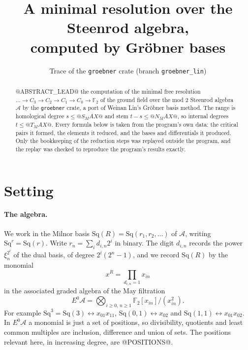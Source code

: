 \documentclass[11pt]{article}
\title{A minimal resolution over the Steenrod algebra,\\ computed by Gröbner bases}
\author{Trace of the \texttt{groebner} crate (branch \texttt{groebner\_lin})}
\date{}
\newcommand{\Sq}{\mathrm{Sq}}
\newcommand{\F}{\mathbb{F}_2}
\newcommand{\A}{\mathcal{A}}
\begin{document}
\maketitle

\begin{abstract}
@ABSTRACT_LEAD@ the computation of the minimal free resolution
$\dots \to C_3 \to C_2 \to C_1 \to C_0 \to \F$ of the ground field over the mod $2$ Steenrod
algebra $\A$ by the \texttt{groebner} crate, a port of Weinan Lin's Gröbner basis method. The
range is homological degree $s \le @S_MAX@$ and stem $t - s \le @N_MAX@$, so internal degrees $t \le @T_MAX@$.
Every formula below is taken from the program's own data: the critical pairs it formed, the
elements it reduced, and the bases and differentials it produced. Only the bookkeeping of the
reduction steps was replayed outside the program, and the replay was checked to reproduce the
program's results exactly.
\end{abstract}

\section{Setting}

\paragraph{The algebra.}
We work in the Milnor basis $\Sq(R) = \Sq(r_1, r_2, \dots)$ of $\A$, writing $\Sq^r = \Sq(r)$.
Write $r_n = \sum_i d_{i,n} 2^i$ in binary. The digit $d_{i,n}$ records the power
$\xi_n^{2^i}$ of the dual basis, of degree $2^i(2^n - 1)$, and we record $\Sq(R)$ by the
monomial
\[ x^R = \prod_{d_{i,n} = 1} x_{in} \]
in the associated graded algebra of the May filtration
\[ E^0\A = \bigotimes_{i \ge 0,\, n \ge 1} \F[x_{in}]/(x_{in}^2). \]
For example $\Sq^3 = \Sq(3) \leftrightarrow x_{01}x_{11}$, $\Sq(0,1) \leftrightarrow x_{02}$ and
$\Sq(1,1) \leftrightarrow x_{01}x_{02}$. In $E^0\A$ a monomial is just a set of positions, so
divisibility, quotients and least common multiples are inclusion, difference and union of sets.
The positions relevant here, in increasing degree, are
@POSITIONS@.
\end{document}

